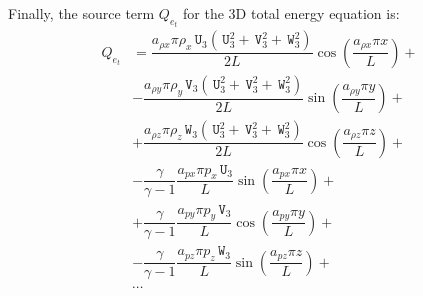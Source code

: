 \documentclass[10pt]{article}
\newcommand{\U}{\,\mathtt{U}}
\newcommand{\V}{\,\mathtt{V}}
\newcommand{\W}{\,\mathtt{W}}
\begin{document}
Finally, the source term $Q_{e_t}$ for the 3D total energy equation is:
\begin{equation*}
 \begin{split}
Q_{e_t} &= \dfrac{a_{\rho x} \pi \rho_x \U_3 (\U_3^2+\V_3^2+\W_3^2)}{2L}\cos\left(\dfrac{a_{\rho x} \pi x}{L}\right)+\\
&- \dfrac{a_{\rho y} \pi \rho_y \V_3 (\U_3^2+\V_3^2+\W_3^2)}{2L}\sin\left(\dfrac{a_{\rho y} \pi y}{L}\right)+\\
&+  \dfrac{a_{\rho z} \pi \rho_z \W_3 (\U_3^2+\V_3^2+\W_3^2)}{2L}\cos\left(\dfrac{a_{\rho z} \pi z}{L}\right)+\\
&-\dfrac{\gamma}{\gamma-1}\dfrac{a_{px} \pi p_x  \U_3}{L}\sin\left(\dfrac{a_{px} \pi x}{L}\right) +\\
&+\dfrac{\gamma}{\gamma-1}\dfrac{a_{py} \pi p_y \V_3}{L}\cos\left(\dfrac{a_{py} \pi y}{L}\right) +\\
&-\dfrac{\gamma}{\gamma-1}\dfrac{a_{pz}\pi  p_z  \W_3}{L}\sin\left(\dfrac{a_{pz} \pi z}{L}\right) +\\
&\cdots\\
 \end{split}
\end{equation*}
\end{document}
